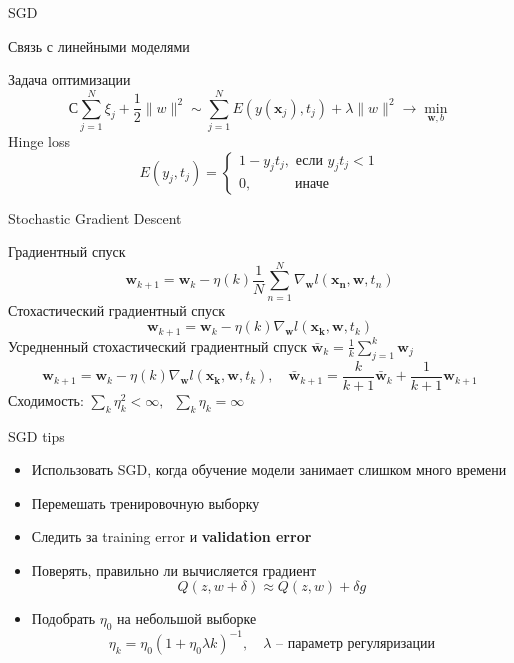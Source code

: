 \documentclass[10pt]{beamer}
\begin{document}
\begin{frame}{}

\begin{center}
\Large SGD
\end{center}

\end{frame}

\begin{frame}{Связь с линейными моделями}

Задача оптимизации 
\[
С \sum_{j=1}^N \xi_j + \frac{1}{2} \|w\|^2 \sim \sum_{j=1}^N E(y(\mathbf{x}_j), t_j) + \lambda \|w\|^2 \rightarrow \min_{\mathbf{w}, b}
\]
Hinge loss
\[
E(y_j, t_j) = \begin{cases}
1 - y_j t_j, \text{ если } y_j t_j < 1 \\
0, \quad\quad\;\;\,\text{ иначе }
\end{cases}
\]

\end{frame}

\begin{frame}{Stochastic Gradient Descent}

Градиентный спуск
\[
\mathbf{w}_{k+1} = \mathbf{w}_k - \eta(k) \frac 1 N \sum_{n=1}^N \nabla_\mathbf{w} l(\mathbf{x_n, \mathbf{w}}, t_n)
\]
Стохастический градиентный спуск
\[
\mathbf{w}_{k+1} = \mathbf{w}_k - \eta(k) \nabla_\mathbf{w} l(\mathbf{x_k, \mathbf{w}}, t_k)
\]
Усредненный стохастический градиентный спуск $\bar{\mathbf{w}}_k = \frac 1 k \sum_{j=1}^k \mathbf{w}_j$
\[
\mathbf{w}_{k+1} = \mathbf{w}_k - \eta(k) \nabla_\mathbf{w} l(\mathbf{x_k, \mathbf{w}}, t_k), \quad \bar{\mathbf{w}}_{k+1} = \frac{k}{k+1} \bar{\mathbf{w}}_{k} + \frac{1}{k+1} \mathbf{w}_{k+1}
\]
Сходимость: $\sum_k \eta_k^2 < \infty, \;\; \sum_k \eta_k = \infty$

\end{frame}

\begin{frame}{SGD tips}

\begin{itemize}
\item Использовать SGD, когда обучение модели занимает слишком много времени
\item Перемешать тренировочную выборку
\item Следить за training error и {\bf validation error}
\item Поверять, правильно ли вычисляется градиент 
\[
Q(z, w + \delta) \approx Q(z, w) + \delta g
\]
\item Подобрать $\eta_0$ на небольшой выборке 
\[
\eta_k = \eta_0 (1 + \eta_0 \lambda k)^{-1}, \quad \lambda\text{ -- параметр регуляризации}
\] 
\end{itemize}

\end{frame}
\end{document}
